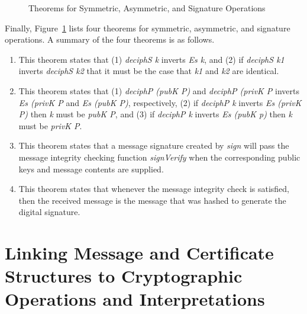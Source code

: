 \begin{figure}[tb]
  \centering
  \begin{minipage}{1.0\linewidth}
    \vspace*{-0.1in}
    \HOLcipherTheoremsdeciphSXXclauses
    \vspace*{-0.1in}
    \HOLcipherTheoremsdeciphPXXclauses
    \tealtext{[signVerifyOK]}\vspace*{-0.1in}
    \HOLcipherTheoremssignVerifyOK
    \tealtext{[signVerify\_11]}\vspace*{-0.1in}
    \HOLcipherTheoremssignVerifyXXOneOne
  \end{minipage}
  \caption{Theorems for Symmetric, Asymmetric, and Signature Operations}
  \label{fig:cipher-theorems}
\end{figure}

Finally, Figure~\ref{fig:cipher-theorems} lists four theorems for
symmetric, asymmetric, and signature operations. A summary of the four
theorems is as follows.
\begin{enumerate}[{-}]
\item {} This theorem states that (1)
  \emph{deciphS k} inverts \emph{Es k}, and (2) if \emph{deciphS k1}
  inverts \emph{deciphS k2} that it must be the case that \emph{k1} and
  \emph{k2} are identical.
\item {} This theorem states that (1)
  \emph{deciphP (pubK P)} and \emph{deciphP (privK P} inverts \emph{Es
    (privK P} and \emph{Es (pubK P)}, respectively, (2) if
  \emph{deciphP k} inverts \emph{Es (privK P)} then \emph{k} must be
  \emph{pubK P}, and (3) if \emph{deciphP k} inverts \emph{Es (pubK
    p)} then \emph{k} must be \emph{privK P}.
\item \tealtext{[signVerifyOK]} This theorem states that a message
  signature created by \emph{sign} will pass the message integrity
  checking function \emph{signVerify} when the corresponding public
  keys and message contents are supplied.
\item \tealtext{[signVerify\_11]} This theorem states that whenever
  the message integrity check is satisfied, then the received message
  is the message that was hashed to generate the digital signature.
\end{enumerate}

\section{Linking Message and Certificate Structures to Cryptographic Operations and Interpretations}
\label{sec:structure-interpretation}

